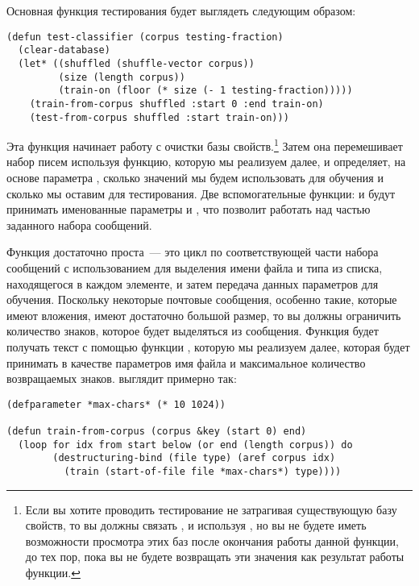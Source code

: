 Основная функция тестирования будет выглядеть следующим образом:

\begin{lstlisting}
(defun test-classifier (corpus testing-fraction)
  (clear-database)
  (let* ((shuffled (shuffle-vector corpus))
         (size (length corpus))
         (train-on (floor (* size (- 1 testing-fraction)))))
    (train-from-corpus shuffled :start 0 :end train-on)
    (test-from-corpus shuffled :start train-on)))
\end{lstlisting}

Эта функция начинает работу с очистки базы свойств.\footnote{Если вы хотите проводить
  тестирование не затрагивая существующую базу свойств, то вы должны связать
  ,  и  используя
  , но вы не будете иметь возможности просмотра этих баз после окончания работы
  данной функции, до тех пор, пока вы не будете возвращать эти значения как результат
  работы функции.}  Затем она перемешивает набор писем используя функцию, которую мы
реализуем далее, и определяет, на основе параметра , сколько
значений мы будем использовать для обучения и сколько мы оставим для тестирования.  Две
вспомогательные функции:  и  будут
принимать именованные параметры  и , что позволит работать над
частью заданного набора сообщений.

Функция  достаточно проста~--- это цикл по соответствующей части
набора сообщений с использованием  для выделения имени файла и
типа из списка, находящегося в каждом элементе, и затем передача данных параметров для
обучения.  Поскольку некоторые почтовые сообщения, особенно такие, которые имеют вложения,
имеют достаточно большой размер, то вы должны ограничить количество знаков, которое будет
выделяться из сообщения.  Функция будет получать текст с помощью функции
, которую мы реализуем далее, которая будет принимать в качестве
параметров имя файла и максимальное количество возвращаемых знаков.
 выглядит примерно так:

\begin{lstlisting}
(defparameter *max-chars* (* 10 1024))

(defun train-from-corpus (corpus &key (start 0) end)
  (loop for idx from start below (or end (length corpus)) do
        (destructuring-bind (file type) (aref corpus idx)
          (train (start-of-file file *max-chars*) type))))
\end{lstlisting}

